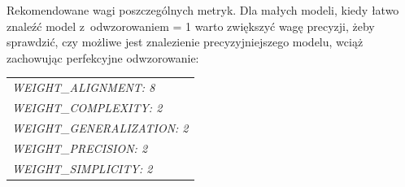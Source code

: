 Rekomendowane wagi poszczególnych metryk. Dla małych modeli, kiedy łatwo znaleźć model z~odwzorowaniem = 1 warto zwiększyć wagę precyzji, żeby sprawdzić, czy możliwe jest znalezienie precyzyjniejszego modelu, wciąż zachowując perfekcyjne odwzorowanie: 
 \begin{center}
  \begin{tabular}{l}
    \textit{WEIGHT\_ALIGNMENT:              8} \\
	\textit{WEIGHT\_COMPLEXITY:              2} \\
	\textit{WEIGHT\_GENERALIZATION:          2} \\
	\textit{WEIGHT\_PRECISION:               2} \\
	\textit{WEIGHT\_SIMPLICITY:              2}
  \end{tabular}
 \end{center}

